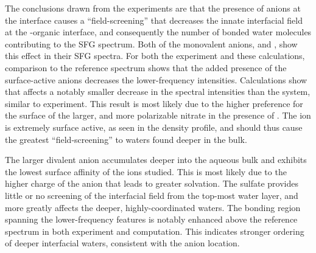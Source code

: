 The conclusions drawn from the experiments are that the presence of anions at the interface causes a ``field-screening'' that decreases the innate interfacial field at the \wat-organic interface, and consequently the number of bonded water molecules contributing to the SFG spectrum. Both of the monovalent anions, \cl and \nit, show this effect in their SFG spectra. For both the experiment and these calculations, comparison to the reference \ctcwat spectrum shows that the added presence of the surface-active anions decreases the lower-frequency intensities. Calculations show that \cl affects a notably smaller decrease in the spectral intensities than the \nit system, similar to experiment. This result is most likely due to the higher preference for the surface of the larger, and more polarizable nitrate in the presence of \ctc. The \nit ion is extremely surface active, as seen in the density profile, and should thus cause the greatest ``field-screening'' to waters found deeper in the bulk.

The larger divalent \sul anion accumulates deeper into the aqueous bulk and exhibits the lowest surface affinity of the ions studied. This is most likely due to the higher charge of the anion that leads to greater solvation. The sulfate provides little or no screening of the interfacial field from the top-most water layer, and more greatly affects the deeper, highly-coordinated waters. The bonding region spanning the lower-frequency features is notably enhanced above the reference spectrum in both experiment and computation. This indicates stronger ordering of deeper interfacial waters, consistent with the anion location.

